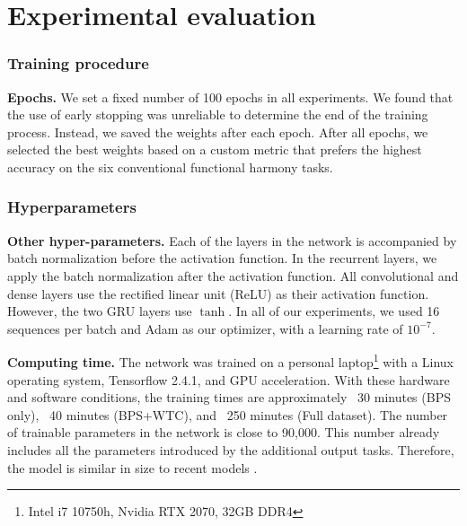\chapter{Experimental evaluation}
\label{chap:experiment}


\subsection{Training procedure}

\textbf{Epochs.}
We set a fixed number of 100 epochs in all experiments. 
We found that the use of early stopping was unreliable to determine the end of the training process.
Instead, we saved the weights after each epoch. 
After all epochs, we selected the best weights based on a custom metric that prefers the highest accuracy on the six conventional functional harmony tasks.

\subsection{Hyperparameters}

\textbf{Other hyper-parameters.}
Each of the layers in the network is accompanied by batch normalization before the activation function. In the recurrent layers, we apply the batch normalization after the activation function. All convolutional and dense layers use the rectified linear unit (ReLU) as their activation function. However, the two GRU layers use $\tanh$. In all of our experiments, we used 16 sequences per batch and Adam \cite{kingma_adam_2014} as our optimizer, with a learning rate of $10^{-7}$.



\textbf{Computing time.} The network was trained on a personal laptop\footnote{Intel i7 10750h, Nvidia RTX 2070, 32GB DDR4} with a Linux operating system, Tensorflow 2.4.1, and GPU acceleration.
With these hardware and software conditions, the training times are approximately ~30 minutes (BPS only), ~40 minutes (BPS+WTC), and ~250 minutes (Full dataset). 
The number of trainable parameters in the network is close to 90,000. This number already includes all the parameters introduced by the additional output tasks. Therefore, the model is similar in size to recent models \cite{micchi_not_2020, chen_attend_2021}.

